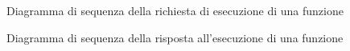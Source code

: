 \begin{figure}[H]
	\noindent
	\caption{Diagramma di sequenza della richiesta di esecuzione di una funzione}
\end{figure}
\begin{figure}[H]
	\noindent
	\caption{Diagramma di sequenza della risposta all'esecuzione di una funzione}
\end{figure}

